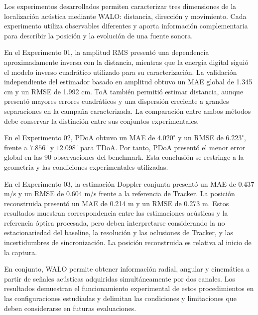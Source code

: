 Los experimentos desarrollados permiten caracterizar tres
dimensiones de la localización acústica mediante WALO:
distancia, dirección y movimiento. Cada experimento utiliza
observables diferentes y aporta información complementaria
para describir la posición y la evolución de una fuente
sonora.

En el Experimento 01, la amplitud RMS presentó una
dependencia aproximadamente inversa con la distancia,
mientras que la energía digital siguió el modelo inverso
cuadrático utilizado para su caracterización. La validación
independiente del estimador basado en amplitud obtuvo un
MAE global de 1.345 cm y un RMSE de 1.992 cm. ToA también
permitió estimar distancia, aunque presentó mayores errores
cuadráticos y una dispersión creciente a grandes
separaciones en la campaña caracterizada. La comparación
entre ambos métodos debe conservar la distinción entre
sus conjuntos experimentales.

En el Experimento 02, PDoA obtuvo un MAE de $4.020^\circ$
y un RMSE de $6.223^\circ$, frente a $7.856^\circ$ y
$12.098^\circ$ para TDoA. Por tanto, PDoA presentó el
menor error global en las 90 observaciones del benchmark.
Esta conclusión se restringe a la geometría y las
condiciones experimentales utilizadas.

En el Experimento 03, la estimación Doppler conjunta
presentó un MAE de 0.437 m/s y un RMSE de 0.604 m/s frente
a la referencia de Tracker. La posición reconstruida
presentó un MAE de 0.214 m y un RMSE de 0.273 m. Estos
resultados muestran correspondencia entre las estimaciones
acústicas y la referencia óptica procesada, pero deben
interpretarse considerando la no estacionariedad del
baseline, la resolución y las oclusiones de Tracker,
y las incertidumbres de sincronización. La posición
reconstruida es relativa al inicio de la captura.

En conjunto, WALO permite obtener información radial,
angular y cinemática a partir de señales acústicas
adquiridas simultáneamente por dos canales. Los resultados
demuestran el funcionamiento experimental de estos
procedimientos en las configuraciones estudiadas y
delimitan las condiciones y limitaciones que deben
considerarse en futuras evaluaciones.
